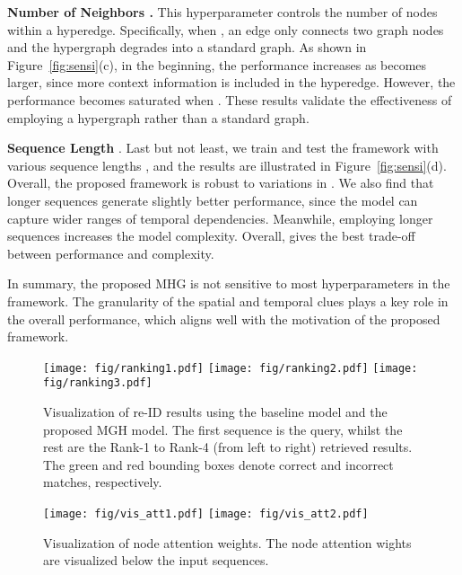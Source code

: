 \documentclass[10pt,twocolumn,letterpaper]{article}
\begin{document}
\textbf{Number of Neighbors .}
This hyperparameter controls the number of nodes within a hyperedge. Specifically, when , an edge only connects two graph nodes and the hypergraph degrades into a standard graph. As shown in Figure~\ref{fig:sensi}(c), in the beginning, the performance increases as  becomes larger, since more context information is included in the hyperedge. However, the performance becomes saturated when . These results validate the effectiveness of employing a hypergraph rather than a standard graph. 


\textbf{Sequence Length }.
Last but not least, we train and test the framework with various sequence lengths , and the results are illustrated in Figure~\ref{fig:sensi}(d). Overall, the proposed framework is robust to variations in . We also find that longer sequences generate slightly better performance, since the model can capture wider ranges of temporal dependencies. Meanwhile, employing longer sequences increases the model complexity. Overall,  gives the best trade-off between performance and complexity. 

In summary, the proposed MHG is not sensitive to most hyperparameters in the framework. The granularity of the spatial and temporal clues plays a key role in the overall performance, which aligns well with the motivation of the proposed framework.

\begin{figure*}[t]
\setlength{\abovecaptionskip}{-0.01mm}
    \centering
    \texttt{[image: fig/ranking1.pdf]}
    \texttt{[image: fig/ranking2.pdf]}
    \texttt{[image: fig/ranking3.pdf]}
    \caption{Visualization of re-ID results using the baseline model and the proposed MGH model. The first sequence is the query, whilst the rest are the Rank-1 to Rank-4 (from left to right) retrieved results. The green and red bounding boxes denote correct and incorrect matches, respectively.} \label{fig:ranking}
    \vspace{-4mm}
\end{figure*}




\begin{figure}[t]
\setlength{\abovecaptionskip}{-0.01mm}
\centering
\texttt{[image: fig/vis\_att1.pdf]}
\texttt{[image: fig/vis\_att2.pdf]}
\caption{Visualization of node attention weights. The node attention wights are visualized below the input sequences.}
\label{fig:vis_att}
\end{figure}
\end{document}
